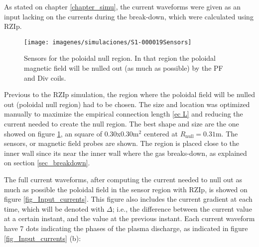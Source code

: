 \documentclass[a4paper,12pt,oneside]{book}
\begin{document}
As stated on chapter \ref{chapter_simu}, the current waveforms were given as an input lacking on the currents during the break-down, which were calculated using RZIp.


\begin{figure}[t]
\centering
\texttt{[image: imagenes/simulaciones/S1-000019Sensors]}
\caption{Sensors for the poloidal null region. In that region the poloidal magnetic field will be nulled out (as much as possible) by the PF and Div coils.}
\label{fig_sensors}
\end{figure}

Previous to the RZIp simulation, the region where the poloidal field will be nulled out (poloidal null region) had to be chosen. The size and location was optimized manually to maximize the empirical connection length \eqref{ec L} and reducing the current needed to create the null region. The best shape and size are the one showed on figure \ref{fig_sensors}, an square of 0.30x0.30$\text{m}^2$ centered at $R_\text{null}=0.31$m. The sensors, or magnetic field probes are shown. The region is placed close to the inner wall since its near the inner wall where the gas breaks-down, as explained on section \ref{sec_breakdown}.



The full current waveforms, after computing the current needed to null out as much as possible the poloidal field in the sensor region with RZIp, is showed on figure \ref{fig_Input_currents}. This figure also includes the current gradient at each time, which will be denoted with $\Delta$; i.e., the difference between the current value at a certain instant, and the value at the previous instant.
%
%
Each current waveform have 7 dots indicating the phases of the plasma discharge, as indicated in figure \ref{fig_Input_currents} (b):
\end{document}
